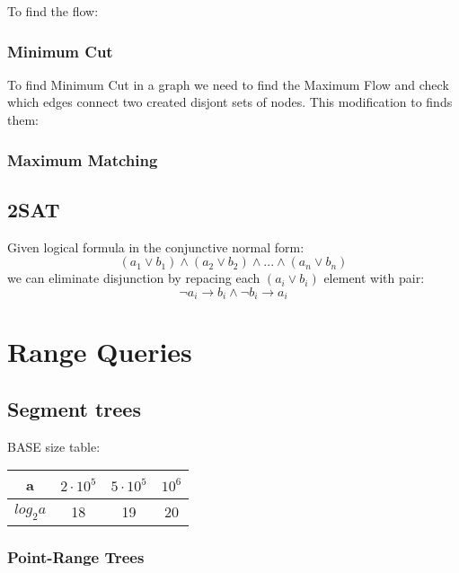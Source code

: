 \documentclass[13pt]{article}
\begin{document}
To find the flow:


\subsubsection{Minimum Cut}
To find Minimum Cut in a graph we need to find the Maximum Flow and check which edges connect two created disjont sets of nodes. This modification to finds them:

\subsubsection{Maximum Matching}

\subsection{2SAT}

Given logical formula in the conjunctive normal form:
\[ (a_1 \vee b_1) \wedge  (a_2 \vee b_2) \wedge ... \wedge (a_{n} \vee b_{n})\]
we can eliminate disjunction by repacing each \( (a_i \vee b_i) \) element with pair:
\[ \neg a_i \rightarrow b_i \wedge \neg b_i \rightarrow a_i \]



\section{Range Queries}

\subsection{Segment trees}

BASE size table:
\begin{center}
	\begin{tabular}{ c || c | c | c }
		a          & \(2 \cdot 10^5\) & \(5 \cdot 10^5\) & \(10^6\) \\
		\hline\hline
		\(log_2a\) & 18               & 19               & 20
	\end{tabular}
\end{center}

\subsubsection{Point-Range Trees}

\end{document}
